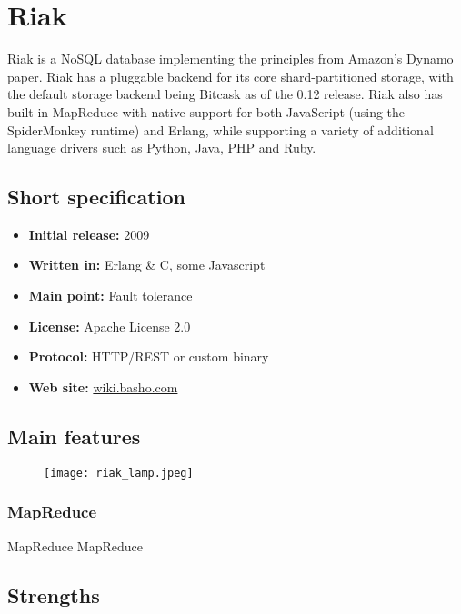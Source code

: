\chapter{Riak}

Riak is a NoSQL database implementing the principles from Amazon's Dynamo paper.
Riak has a pluggable backend for its core shard-partitioned storage, with the default storage backend being Bitcask as of the 0.12 release. Riak also has built-in MapReduce with native support for both JavaScript (using the SpiderMonkey runtime) and Erlang, while supporting a variety of additional language drivers such as Python, Java, PHP and Ruby.

\section{Short specification}

\begin{itemize}
  \item \textbf{Initial release:} 2009
  \item \textbf{Written in:} Erlang \& C, some Javascript
  \item \textbf{Main point:} Fault tolerance
  \item \textbf{License:} Apache License 2.0
  \item \textbf{Protocol:} HTTP/REST or custom binary
  \item \textbf{Web site:} \href{http://wiki.basho.com/}{wiki.basho.com}
\end{itemize}

\section{Main features}

\begin{figure}[hb]
  \centering
  \texttt{[image: riak\_lamp.jpeg]}
\end{figure}

\subsection{MapReduce}

MapReduce MapReduce

\section{Strengths}

